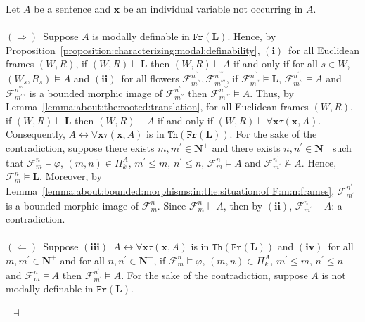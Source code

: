 \documentclass[draft]{article}
\newenvironment{proof}{{\bf Proof:}}{~$\dashv$\\}
\def\Th{\mathtt{Th}}
\def\Fr{\mathtt{Fr}}
\def\L{\mathbf{L}}
\begin{document}
\begin{proof}
%
%
Let $A$ be a sentence and $\mathbf{x}$ be an individual variable not occurring in $A$.
%
%
\\
\\
%
%
$\mathbf{(\Rightarrow)}$~Suppose $A$ is modally definable in $\Fr(\L)$.
Hence, by Proposition~\ref{proposition:characterizing:modal:definability}, $\mathbf{(i)}$~for all Euclidean frames $(W,R)$, if $(W,R){\models}\L$ then $(W,R){\models}A$ if and only if for all $s{\in}W$, $(W_{s},R_{s}){\models}A$ and $\mathbf{(ii)}$~for all flowers ${\mathcal F}_{m^{\prime\prime}}^{n^{\prime\prime}},{\mathcal F}_{m^{\prime\prime\prime}}^{n^{\prime\prime\prime}}$, if ${\mathcal F}_{m^{\prime\prime}}^{n^{\prime\prime}}{\models}\L$, ${\mathcal F}_{m^{\prime\prime}}^{n^{\prime\prime}}{\models}A$ and ${\mathcal F}_{m^{\prime\prime\prime}}^{n^{\prime\prime\prime}}$ is a bounded morphic image of ${\mathcal F}_{m^{\prime\prime}}^{n^{\prime\prime}}$ then ${\mathcal F}_{m^{\prime\prime\prime}}^{n^{\prime\prime\prime}}{\models}A$.
Thus, by Lemma~\ref{lemma:about:the:rooted:translation}, for all Euclidean frames $(W,R)$, if $(W,R){\models}\L$ then $(W,R){\models}A$ if and only if $(W,R){\models}\forall\mathbf{x}\tau(\mathbf{x},A)$.
Consequently, $A{\leftrightarrow}\forall\mathbf{x}\tau(\mathbf{x},A)$ is in $\Th(\Fr(\L))$.
For the sake of the contradiction, suppose there exists $m,m^{\prime}{\in}\mathbf{N}^{+}$ and there exists $n,n^{\prime}{\in}\mathbf{N}^{-}$ such that ${\mathcal F}_{m}^{n}{\models}\varphi$, $(m,n){\in}\Pi_{k}^{A}$, $m^{\prime}{\leq}m$, $n^{\prime}{\leq}n$, ${\mathcal F}_{m}^{n}{\models}A$ and ${\mathcal F}_{m^{\prime}}^{n^{\prime}}{\not\models}A$.
Hence, ${\mathcal F}_{m}^{n}{\models}\L$.
Moreover, by Lemma~\ref{lemma:about:bounded:morphisms:in:the:situation:of F:m:n:frames}, ${\mathcal F}_{m^{\prime}}^{n^{\prime}}$ is a bounded morphic image of ${\mathcal F}_{m}^{n}$.
Since ${\mathcal F}_{m}^{n}{\models}A$, then by $\mathbf{(ii)}$, ${\mathcal F}_{m^{\prime}}^{n^{\prime}}{\models}A$: a contradiction.
%
%
\\
\\
%
%
$\mathbf{(\Leftarrow)}$~Suppose $\mathbf{(iii)}$~$A{\leftrightarrow}\forall\mathbf{x}\tau(\mathbf{x},A)$ is in $\Th(\Fr(\L))$ and $\mathbf{(iv)}$~for all $m,m^{\prime}{\in}\mathbf{N}^{+}$ and for all $n,n^{\prime}{\in}\mathbf{N}^{-}$, if ${\mathcal F}_{m}^{n}{\models}\varphi$, $(m,n){\in}\Pi_{k}^{A}$, $m^{\prime}{\leq}m$, $n^{\prime}{\leq}n$ and ${\mathcal F}_{m}^{n}{\models}A$ then ${\mathcal F}_{m^{\prime}}^{n^{\prime}}{\models}A$.
For the sake of the contradiction, suppose $A$ is not modally definable in $\Fr(\L)$.

\end{proof}
\end{document}
